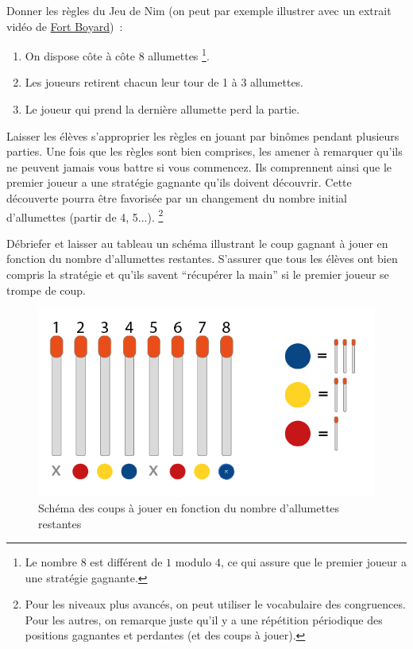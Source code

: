 \documentclass[a4paper,12pt]{article}
\begin{document}
Donner les règles du Jeu de Nim (on peut par exemple illustrer avec un extrait vidéo de \href{https://fortboyard.tv}{Fort Boyard})~:
\begin{enumerate}
  \item On dispose côte à côte 8 allumettes \footnote{Le nombre \(8\) est différent de \(1\) modulo \(4\), ce qui assure que le premier joueur a une stratégie gagnante.}.
  \item Les joueurs retirent chacun leur tour de 1 à 3 allumettes.
  \item Le joueur qui prend la dernière allumette perd la partie.
\end{enumerate}

Laisser les élèves s'approprier les règles en jouant par binômes pendant plusieurs parties. Une fois que les règles sont bien comprises, les amener à remarquer qu'ils ne peuvent jamais vous battre si vous commencez. Ils comprennent ainsi que le premier joueur a une stratégie gagnante qu'ils doivent découvrir. Cette découverte pourra être favorisée par un changement du nombre initial d'allumettes (partir de 4, 5...).  \footnote{Pour les niveaux plus avancés, on peut utiliser le vocabulaire des congruences. Pour les autres, on remarque juste qu'il y a une répétition périodique des positions gagnantes et perdantes (et des coups à jouer).}

Débriefer et laisser au tableau un schéma illustrant le coup gagnant à jouer en fonction du nombre d'allumettes restantes. S'assurer que tous les élèves ont bien compris la stratégie et qu'ils savent ``récupérer la main'' si le premier joueur se trompe de coup.

\begin{figure}[h!]
\centering
\includegraphics[scale = 0.4]{./Images/fig2-v3.png}
\caption{Schéma des coups à jouer en fonction du nombre d'allumettes restantes}
\label{fig:schemStrategie}
\end{figure}
\end{document}
